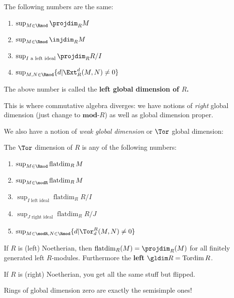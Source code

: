 \documentclass[12pt]{article}
\begin{document}
\begin{thm}
	The following numbers are the same:
	\begin{enumerate}
		\item $\sup_{M\in\Rmod}\projdim_R M$
		\item $\sup_{M\in\Rmod}\injdim_R M$
		\item $\sup_{I\text{ a left ideal}}\projdim_RR/I$
		\item $\sup_{M,N\in\Rmod}\{d|\Ext_R^d(M,N)\ne 0\}$
	\end{enumerate}
\end{thm}
\begin{defn}
	The above number is called the \textbf{left global dimension of $R$.}
\end{defn}
\begin{rmk}
	This is where commutative algebra diverges: we have notions of \textit{right}
 global dimension (just change to $\mathbf{mod}$-$R$) as well as global dimension proper.
\end{rmk}

We also have a notion of \textit{weak global dimension} or $\Tor$ global dimension:
\begin{defn}
	The $\Tor$ dimension of $R$ is any of the following numbers:
	\begin{enumerate}
		\item $\sup_{M\in\Rmod}\operatorname{flatdim}_RM$
		\item $\sup_{M\in\modR}\operatorname{flatdim}_RM$
		\item $\sup_{I\text{ left ideal}}\operatorname{flatdim}_R R/I$
		\item $\sup_{J\text{ right ideal}}\operatorname{flatdim}_R R/J$
		\item $\sup_{M\in\modR,N\in\Rmod}\{d|\Tor_d^R(M,N)\ne 0\}$
	\end{enumerate}
\end{defn}
\begin{rmk}
	If $R$ is (left) Noetherian, then $\operatorname{flatdim}_R(M)=\projdim_R(M)$ for all finitely
	generated left $R$-modules. Furthermore the \textbf{left} $\gldim R=\operatorname{Tordim}R$.
\end{rmk}

\begin{rmk}
	If $R$ is (right) Noetherian, you get all the same stuff but flipped.
\end{rmk}
\begin{rmk}
	Rings of global dimension zero are exactly the semisimple ones!
\end{rmk}
\end{document}
